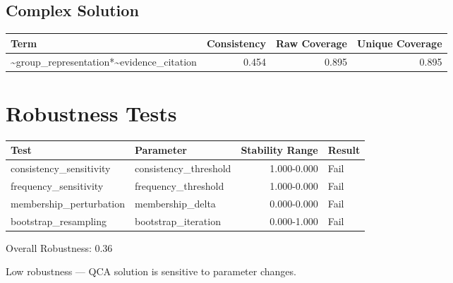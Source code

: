 \documentclass[12pt,a4paper]{article}
\begin{document}
\subsection{Complex Solution}

\begin{tabular}{lrrr}
\toprule
Term & Consistency & Raw Coverage & Unique Coverage \\
\midrule

    \textasciitilde{}group\_representation*\textasciitilde{}evidence\_citation & 0.454 & 0.895 & 0.895 \\

\bottomrule
\end{tabular}


\section{Robustness Tests}
\begin{tabular}{llrl}
\toprule
Test & Parameter & Stability Range & Result \\
\midrule
    consistency\_sensitivity & consistency\_threshold & 1.000-0.000 & Fail \\
    frequency\_sensitivity & frequency\_threshold & 1.000-0.000 & Fail \\
    membership\_perturbation & membership\_delta & 0.000-0.000 & Fail \\
    bootstrap\_resampling & bootstrap\_iteration & 0.000-1.000 & Fail \\
\bottomrule
\end{tabular}

Overall Robustness: 0.36

Low robustness — QCA solution is sensitive to parameter changes.
\end{document}
